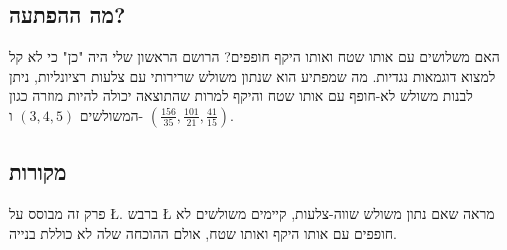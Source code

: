 \subsection*{מה ההפתעה?}

האם משלושים עם אותו שטח ואותו היקף חופפים? הרושם הראשון שלי היה "כן" כי לא קל למצוא דוגמאות נגדיות. מה שמפתיע הוא שנתון משולש שרירותי עם צלעות רציונליות, ניתן לבנות משולש לא-חופף עם אותו שטח והיקף למרות שהתוצאה יכולה להיות מוזרה כגון המשולשים
$(3,4,5)$
ו-%
$\left(\frac{156}{35}, \frac{101}{21}, \frac{41}{15}\right)$.


\subsection*{מקורות}

פרק זה מבוסס על 
\L{\cite{mccallum}}.
ברבש
\L{\cite{marita}}
מראה שאם נתון משולש שווה-צלעות, קיימים משולשים לא חופפים עם אותו היקף ואותו שטח, אולם ההוכחה שלה לא כוללת בנייה. 
